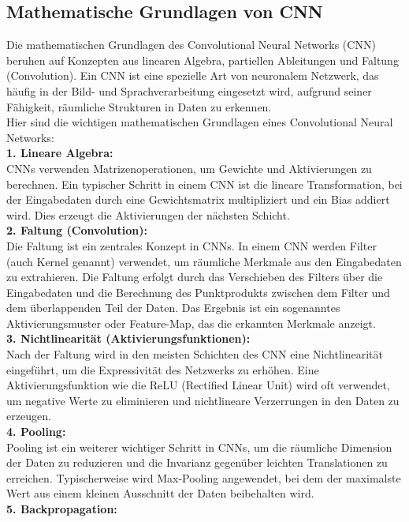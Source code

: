 \documentclass[12pt]{article}
\begin{document}
\subsection{Mathematische Grundlagen von CNN}
Die mathematischen Grundlagen des Convolutional Neural Networks (CNN) beruhen auf Konzepten aus linearen Algebra, partiellen Ableitungen und Faltung (Convolution). Ein CNN ist eine spezielle Art von neuronalem Netzwerk, das häufig in der Bild- und Sprachverarbeitung eingesetzt wird, aufgrund seiner Fähigkeit, räumliche Strukturen in Daten zu erkennen.\\
Hier sind die wichtigen mathematischen Grundlagen eines Convolutional Neural Networks:\\
%
\textbf{1. Lineare Algebra:}\\
CNNs verwenden Matrizenoperationen, um Gewichte und Aktivierungen zu berechnen. Ein typischer Schritt in einem CNN ist die lineare Transformation, bei der Eingabedaten durch eine Gewichtsmatrix multipliziert und ein Bias addiert wird. Dies erzeugt die Aktivierungen der nächsten Schicht.\\
\textbf{2. Faltung (Convolution):}\\
Die Faltung ist ein zentrales Konzept in CNNs. In einem CNN werden Filter (auch Kernel genannt) verwendet, um räumliche Merkmale aus den Eingabedaten zu extrahieren. Die Faltung erfolgt durch das Verschieben des Filters über die Eingabedaten und die Berechnung des Punktprodukts zwischen dem Filter und dem überlappenden Teil der Daten. Das Ergebnis ist ein sogenanntes Aktivierungsmuster oder Feature-Map, das die erkannten Merkmale anzeigt.\\
\textbf{3. Nichtlinearität (Aktivierungsfunktionen):}\\
Nach der Faltung wird in den meisten Schichten des CNN eine Nichtlinearität eingeführt, um die Expressivität des Netzwerks zu erhöhen. Eine Aktivierungsfunktion wie die ReLU (Rectified Linear Unit) wird oft verwendet, um negative Werte zu eliminieren und nichtlineare Verzerrungen in den Daten zu erzeugen.\\
\textbf{4. Pooling:}\\
Pooling ist ein weiterer wichtiger Schritt in CNNs, um die räumliche Dimension der Daten zu reduzieren und die Invarianz gegenüber leichten Translationen zu erreichen. Typischerweise wird Max-Pooling angewendet, bei dem der maximalste Wert aus einem kleinen Ausschnitt der Daten beibehalten wird.\\
\textbf{5. Backpropagation:}\\
\end{document}
